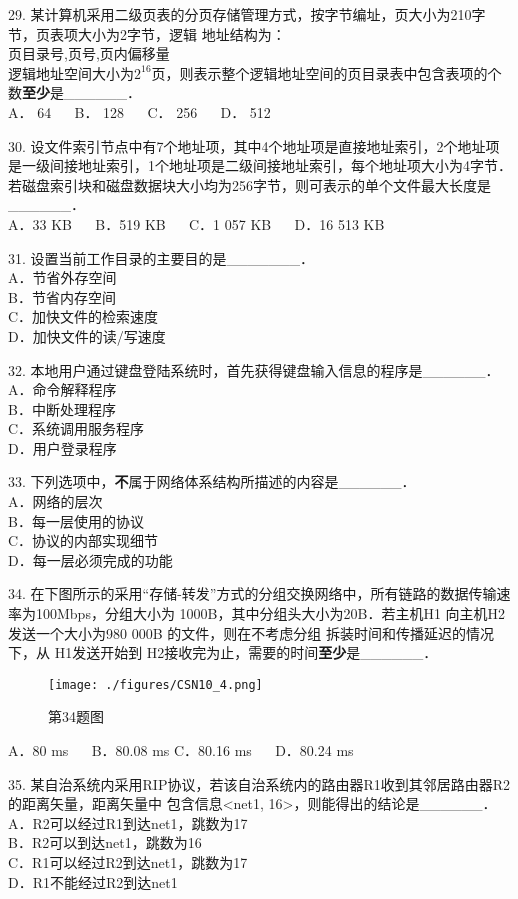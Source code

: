 29. 某计算机采用二级页表的分页存储管理方式，按字节编址，页大小为210字节，页表项大小为2字节，逻辑
地址结构为：  \\
页目录号,页号,页内偏移量 \\
逻辑地址空间大小为$2^{16}$页，则表示整个逻辑地址空间的页目录表中包含表项的个数\textbf{至少}是______． \\
A． 64 $\quad$ B． 128 $\quad$ C． 256 $\quad$ D． 512

30. 设文件索引节点中有7个地址项，其中4个地址项是直接地址索引，2个地址项是一级间接地址索引，1个地址项是二级间接地址索引，每个地址项大小为4字节．若磁盘索引块和磁盘数据块大小均为256字节，则可表示的单个文件最大长度是______． \\
A．33 KB $\quad$ B．519 KB $\quad$ C．1 057 KB $\quad$ D．16 513 KB

31. 设置当前工作目录的主要目的是_______． \\
A．节省外存空间 \\
B．节省内存空间 \\
C．加快文件的检索速度 \\
D．加快文件的读/写速度

32. 本地用户通过键盘登陆系统时，首先获得键盘输入信息的程序是______．  \\
A．命令解释程序 \\
B．中断处理程序 \\
C．系统调用服务程序 \\
D．用户登录程序

33. 下列选项中，\textbf{不}属于网络体系结构所描述的内容是______．  \\
A．网络的层次  \\
B．每一层使用的协议  \\
C．协议的内部实现细节  \\
D．每一层必须完成的功能

34. 在下图所示的采用“存储-转发”方式的分组交换网络中，所有链路的数据传输速率为100Mbps，分组大小为
1000B，其中分组头大小为20B．若主机H1 向主机H2 发送一个大小为980 000B 的文件，则在不考虑分组
拆装时间和传播延迟的情况下，从 H1发送开始到 H2接收完为止，需要的时间\textbf{至少}是______．  \\
\begin{figure}[ht]
\centering
\texttt{[image: ./figures/CSN10\_4.png]}
\caption{第34题图} \label{CSN10_fig4}
\end{figure}
A．80 ms $\quad$ B．80.08 ms
C．80.16 ms $\quad$ D．80.24 ms

35. 某自治系统内采用RIP协议，若该自治系统内的路由器R1收到其邻居路由器R2的距离矢量，距离矢量中
包含信息<net1, 16>，则能得出的结论是______．  \\
A．R2可以经过R1到达net1，跳数为17  \\
B．R2可以到达net1，跳数为16  \\
C．R1可以经过R2到达net1，跳数为17  \\
D．R1不能经过R2到达net1  \\


